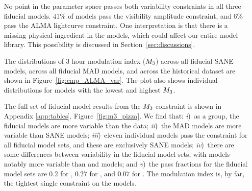No point in the parameter space passes both variability constraints in all three fiducial models.
$41\%$ of models pass the visibility amplitude constraint, and $6\%$ pass the ALMA lightcurve constraint.
One interpretation is that there is a missing physical ingredient in the models, which could affect our entire model library.
This possibility is discussed in Section~\ref{sec:discussions}.


The distributions of 3 hour modulation index ($M_{3}$) across all fiducial SANE models, across all fiducial MAD models, and across the historical dataset are shown in Figure~\ref{fig:cmp_ALMA_var}.
The plot also shows individual distributions for models with the lowest and highest $M_{3}$.

The full set of fiducial model results from the $M_{3}$ constraint is shown in Appendix \ref{app:tables}, Figure~\ref{fig:m3_pizza}.
We find that:
\emph{i})~as a group, the fiducial models are more variable than the data;
\emph{ii})~the MAD models are more variable than SANE models;
\emph{iii})~eleven individual models  pass the constraint for all fiducial model sets, and these are exclusively SANE models;
\emph{iv})~there are some differences between variability in the fiducial model sets, with \hamr models notably more variable than \kharma and \bhac models; and
\emph{v})~the pass fractions for the fiducial model sets are $0.2$ for \kharma, $0.27$ for \bhac, and $0.07$ for \hamr.
The modulation index is, by far, the tightest single constraint on the models.


